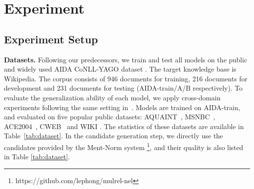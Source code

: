 \section{Experiment}
\label{sec:result}

\subsection{Experiment Setup}
\label{sec:setup}
\textbf{Datasets.} Following our predecessors, we train and test all models on the public and widely used AIDA CoNLL-YAGO dataset \cite{hoffart2011robust}. The target knowledge base is Wikipedia. The corpus consists of 946 documents for training, 216 documents for development and 231 documents for testing (AIDA-train/A/B respectively). To evaluate the generalization ability of each model, we apply cross-domain experiments following the same setting in~\cite{ganea2017deep, le2018improving, yang2018collective}. Models are trained on AIDA-train, and evaluated on five popular public datasets: AQUAINT~\cite{milne2008learning}, MSNBC~\cite{cucerzan2007large}, ACE2004~\cite{ratinov2011local}, CWEB~\cite{guo2016robust} and WIKI \cite{guo2016robust}. The statistics of these datasets are available in Table~\ref{tab:dataset}. In the candidate generation step, we directly use the candidates provided by the Ment-Norm system \cite{le2018improving}\footnote{https://github.com/lephong/mulrel-nel}, and their quality is also listed in Table \ref{tab:dataset}.\\

